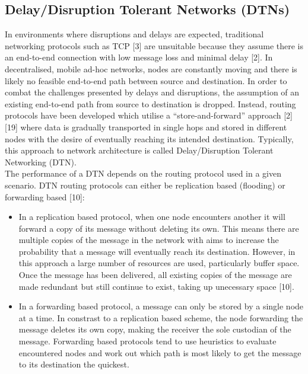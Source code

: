 \documentclass{article}
\begin{document}
\subsection{Delay/Disruption Tolerant Networks (DTNs)}
In environments where disruptions and delays are expected, traditional networking protocols such as TCP [3] are unsuitable because they assume there is an end-to-end connection with low message loss and minimal delay [2]. In decentralised, mobile ad-hoc networks, nodes are constantly moving and there is likely no feasible end-to-end path between source and destination. In order to combat the challenges presented by delays and disruptions, the assumption of an existing end-to-end path from source to destination is dropped. Instead, routing protocols have been developed which utilise a ``store-and-forward'' approach [2][19] where data is gradually transported in single hops and stored in different nodes with the desire of eventually reaching its intended destination. Typically, this approach to network architecture is called Delay/Disruption Tolerant Networking (DTN).\\
\noindent The performance of a DTN depends on the routing protocol used in a given scenario. DTN routing protocols can either be replication based (flooding) or forwarding based [10]:\\
\begin{itemize}
	\item In a replication based protocol, when one node encounters another it will forward a copy of its message without deleting its own. This means there are multiple copies of the message in the network with aims to increase the probability that a message will eventually reach its destination. However, in this approach a large number of resources are used, particularly buffer space. Once the message has been delivered, all existing copies of the message are made redundant but still continue to exist, taking up unecessary space [10].
	\item In a forwarding based protocol, a message can only be stored by a single node at a time. In constrast to a replication based scheme, the node forwarding the message deletes its own copy, making the receiver the sole custodian of the message. Forwarding based protocols tend to use heuristics to evaluate encountered nodes and work out which path is most likely to get the message to its destination the quickest.
\end{itemize}
\end{document}

